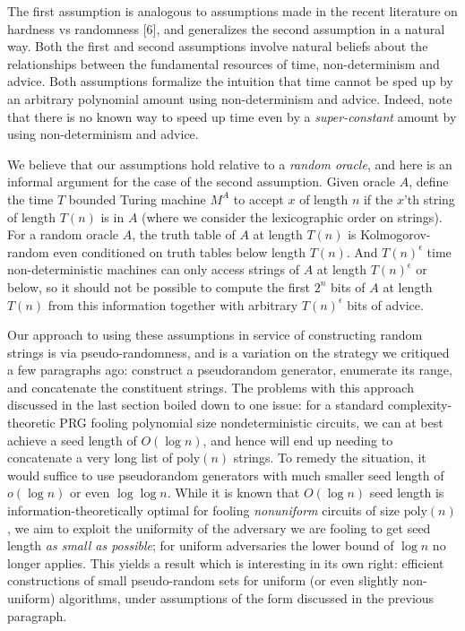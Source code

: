 The first assumption is analogous to assumptions made in the recent literature on hardness vs randomness [6], and generalizes the second assumption in a natural way. Both the first and second assumptions involve natural beliefs about the relationships between the fundamental resources of time, non-determinism and advice. Both assumptions formalize the intuition that time cannot be sped up by an arbitrary polynomial amount using non-determinism and advice. Indeed, note that there is no known way to speed up time even by a \emph{super-constant} amount by using non-determinism and advice.\par




We believe that our assumptions hold relative to a \emph{random oracle}, and here is an informal argument for the case of the second assumption. Given oracle $A$, define the time $T$ bounded Turing machine $M^{A}$ to accept $x$ of length $n$ if the $x$’th string of length $T(n)$ is in $A$ (where we consider the lexicographic order on strings). For a random oracle $A$, the truth table of $A$ at length $T(n)$ is Kolmogorov-random even conditioned on truth tables below length $T(n)$. And $T(n)^{\epsilon}$ time non-deterministic machines can only access strings of $A$ at length $T(n)^{\epsilon}$ or below, so it should not be possible to compute the first $2^{n}$ bits of $A$ at length $T(n)$ from this information together with arbitrary $T(n)^{\epsilon}$ bits of advice.\par




Our approach to using these assumptions in service of constructing random strings is via pseudo-randomness, and is a variation on the strategy we critiqued a few paragraphs ago: construct a pseudorandom generator, enumerate its range, and concatenate the constituent strings. The problems with this approach discussed in the last section boiled down to one issue: for a standard complexity-theoretic PRG fooling polynomial size nondeterministic circuits, we can at best achieve a seed length of $O(\log n)$, and hence will end up needing to concatenate a very long list of $\mathrm{poly}(n)$ strings. To remedy the situation, it would suffice to use pseudorandom generators with much smaller seed length of $o(\log n)$ or even $\log\log n$. While it is known that $O(\log n)$ seed length is information-theoretically optimal for fooling \emph{nonuniform} circuits of size $\mathrm{poly}(n)$, we aim to exploit the uniformity of the adversary we are fooling to get seed length \emph{as small as possible}; for uniform adversaries the lower bound of $\log n$ no longer applies. This yields a result which is interesting in its own right: efficient constructions of small pseudo-random sets for uniform (or even slightly non-uniform) algorithms, under assumptions of the form discussed in the previous paragraph.\par



